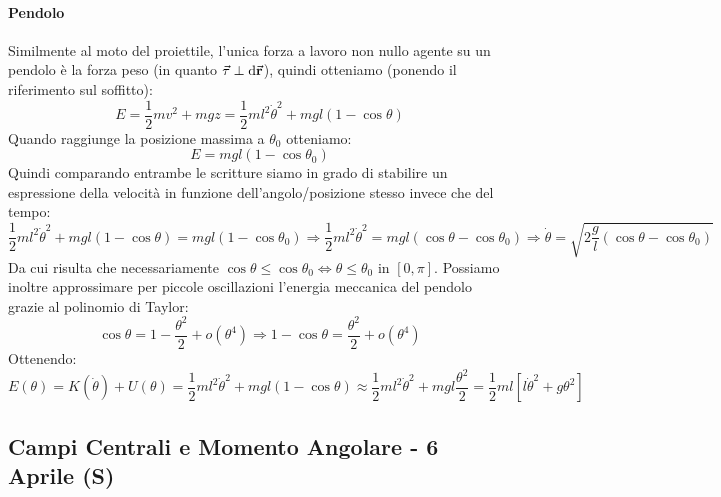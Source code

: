 \documentclass{article}
\newcommand{\then}{\ensuremath{\Rightarrow}}
\renewcommand{\r}{\va{r}}
\newcommand{\tauvt}{\va{\tau}}
\begin{document}
\paragraph{Pendolo}
Similmente al moto del proiettile, l'unica forza a lavoro non nullo agente su un pendolo è la forza peso (in quanto $\tauvt\perp\dd\r$), quindi otteniamo (ponendo il riferimento sul soffitto):
\[E=\frac{1}{2}mv^2+mgz=\frac{1}{2}ml^2\dot{\theta}^2+mgl(1-\cos\theta)\]
Quando raggiunge la posizione massima a $\theta_0$ otteniamo:
\[E=mgl(1-\cos\theta_0)\]
Quindi comparando entrambe le scritture siamo in grado di stabilire un espressione della velocità in funzione dell'angolo/posizione stesso invece che del tempo:
\[\frac{1}{2}ml^2\dot{\theta}^2+mgl(1-\cos\theta)=mgl(1-\cos\theta_0)\then\frac{1}{2}ml^2\dot{\theta}^2=mgl(\cos\theta-\cos\theta_0)\then \dot{\theta}=\sqrt{2\frac{g}{l}(\cos\theta-\cos\theta_0)} \]
Da cui risulta che necessariamente $\cos\theta\leq\cos\theta_0\iff \theta\leq\theta_0$
in $[0,\pi]$.
Possiamo inoltre approssimare per piccole oscillazioni l'energia meccanica del pendolo grazie al polinomio di Taylor:
\[\cos\theta=1-\frac{\theta^2}{2}+o(\theta^4)\then 1-\cos\theta=\frac{\theta^2}{2}+o(\theta^4)\]
Ottenendo:
\[E(\theta)=K(\dot{\theta})+U(\theta)=\frac{1}{2}ml^2\dot{\theta}^2+mgl(1-\cos\theta)\approx\frac{1}{2}ml^2\dot{\theta}^2+mgl\frac{\theta^2}{2}=\boxed{\frac{1}{2}ml[l\dot{\theta}^2+g\theta^2]}\]

\subsection{Campi Centrali e Momento Angolare - 6 Aprile (S)}
\end{document}
